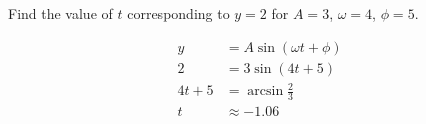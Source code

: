 Find the value of $t$ corresponding to $y=2$ for $A=3$, $\omega=4$, $\phi=5$.

\begin{solution}
\begin{align*}
    y &= A\sin{\left( \omega t + \phi \right)} \\
    2 &= 3\sin{\left( 4t + 5 \right)} \\
    4t+5 &= \arcsin{\frac{2}{3}} \\
    t &\approx -1.06
\end{align*}
\end{solution}